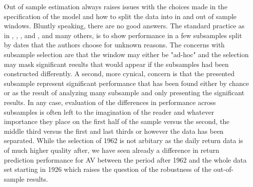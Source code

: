 Out of sample estimation always raises issues with the choices made in the specification of the model and how to split the data into in and out of sample windows. 
Bluntly speaking, there are no good answers. The standard practice as in \citet{Rapach2013}, \citet{Rapach2010}, \citet{Rapach2016}, and \cite{Huang2015}, and many others, is to show performance in a few subsamples split by dates that the authors choose for unknown reasons. The concerns with subsample selection are that the window may either be "ad-hoc" and the selection may mask significant results that would appear if the subsamples had been constructed differently. A second, more cynical, concern is that the presented subsample represent significant performance that has been found either by chance or as the result of analyzing many subsample and only presenting the significant results. In any case, evaluation of the differences in performance across subsamples is often left to the imagination of the reader and whatever importance they place on the first half of the sample versus the second, the middle third versus the first and last thirds or however the data has been separated. While the selection of 1962 is not arbitary as the daily return data is of much higher quality after, we have seen already a difference in return prediction performance for AV between the period after 1962 and the whole data set starting in 1926 which raises the question of the robustness of the out-of-sample results. 

